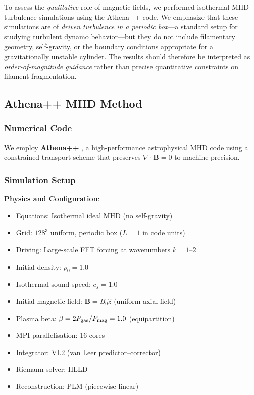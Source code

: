 \documentclass[11pt,a4paper]{article}
\begin{document}
To assess the \textit{qualitative} role of magnetic fields, we performed isothermal MHD turbulence simulations using the Athena++ code. We emphasize that these simulations are of \textit{driven turbulence in a periodic box}—a standard setup for studying turbulent dynamo behavior—but they do not include filamentary geometry, self-gravity, or the boundary conditions appropriate for a gravitationally unstable cylinder. The results should therefore be interpreted as \textit{order-of-magnitude guidance} rather than precise quantitative constraints on filament fragmentation.

\subsection{Athena++ MHD Method}

\subsubsection{Numerical Code}

We employ \textbf{Athena++} \citep{Stone2020}, a high-performance astrophysical MHD code using a constrained transport scheme that preserves $\nabla \cdot \mathbf{B} = 0$ to machine precision.

\subsubsection{Simulation Setup}

\textbf{Physics and Configuration}:
\begin{itemize}
    \item Equations: Isothermal ideal MHD (no self-gravity)
    \item Grid: $128^3$ uniform, periodic box ($L = 1$ in code units)
    \item Driving: Large-scale FFT forcing at wavenumbers $k = 1$--$2$
    \item Initial density: $\rho_0 = 1.0$
    \item Isothermal sound speed: $c_s = 1.0$
    \item Initial magnetic field: $\mathbf{B} = B_0 \hat{z}$ (uniform axial field)
    \item Plasma beta: $\beta = 2P_{\rm gas}/P_{\rm mag} = 1.0$ (equipartition)
    \item MPI parallelisation: 16 cores
    \item Integrator: VL2 (van Leer predictor--corrector)
    \item Riemann solver: HLLD
    \item Reconstruction: PLM (piecewise-linear)
\end{itemize}
\end{document}
